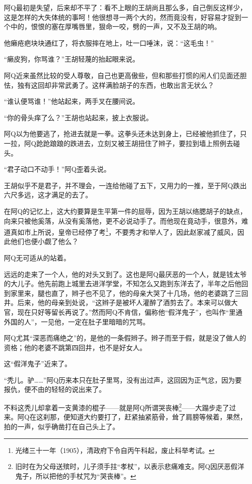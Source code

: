 \documentclass[12pt,UTF8]{ctexbook}
\begin{document}
阿Q最初是失望，后来却不平了：看不上眼的王胡尚且那么多，自己倒反这样少，这是怎样的大失体统的事呵！他很想寻一两个大的，然而竟没有，好容易才捉到一个中的，恨恨的塞在厚嘴唇里，狠命一咬，劈的一声，又不及王胡的响。

他癞疮疤块块通红了，将衣服摔在地上，吐一口唾沫，说：“这毛虫！”

“癞皮狗，你骂谁？”王胡轻蔑的抬起眼来说。

阿Q近来虽然比较的受人尊敬，自己也更高傲些，但和那些打惯的闲人们见面还胆怯，独有这回却非常武勇了。这样满脸胡子的东西，也敢出言无状么？

“谁认便骂谁！”他站起来，两手叉在腰间说。

“你的骨头痒了么？”王胡也站起来，披上衣服说。

阿Q以为他要逃了，抢进去就是一拳。这拳头还未达到身上，已经被他抓住了，只一拉，阿Q跄跄踉踉的跌进去，立刻又被王胡扭住了辫子，要拉到墙上照例去碰头。

“君子动口不动手！”阿Q歪着头说。

王胡似乎不是君子，并不理会，一连给他碰了五下，又用力的一推，至于阿Q跌出六尺多远，这才满足的去了。

在阿Q的记忆上，这大约要算是生平第一件的屈辱，因为王胡以络腮胡子的缺点，向来只被他奚落，从没有奚落他，更不必说动手了。而他现在竟动手，很意外，难道真如市上所说，皇帝已经停了考\footnote{光绪三十一年（1905），清政府下令自丙午科起，废止科举考试。}，不要秀才和举人了，因此赵家减了威风，因此他们也便小觑了他么？

阿Q无可适从的站着。

远远的走来了一个人，他的对头又到了。这也是阿Q最厌恶的一个人，就是钱太爷的大儿子。他先前跑上城里去进洋学堂，不知怎么又跑到东洋去了，半年之后他回到家里来，腿也直了，辫子也不见了，他的母亲大哭了十几场，他的老婆跳了三回井。后来，他的母亲到处说，“这辫子是被坏人灌醉了酒剪去了。本来可以做大官，现在只好等留长再说了。”然而阿Q不肯信，偏称他“假洋鬼子”，也叫作“里通外国的人”，一见他，一定在肚子里暗暗的咒骂。

阿Q尤其“深恶而痛绝之”的，是他的一条假辫子。辫子而至于假，就是没了做人的资格；他的老婆不跳第四回井，也不是好女人。

这“假洋鬼子”近来了。

“秃儿。驴……”阿Q历来本只在肚子里骂，没有出过声，这回因为正气忿，因为要报仇，便不由的轻轻的说出来了。

不料这秃儿却拿着一支黄漆的棍子——就是阿Q所谓哭丧棒\footnote{旧时在为父母送殡时，儿子须手拄“孝杖”，以表示悲痛难支。阿Q因厌恶假洋鬼子，所以把他的手杖咒为“哭丧棒”。}——大蹋步走了过来。阿Q在这刹那，便知道大约要打了，赶紧抽紧筋骨，耸了肩膀等候着，果然，拍的一声，似乎确凿打在自己头上了。
\end{document}
